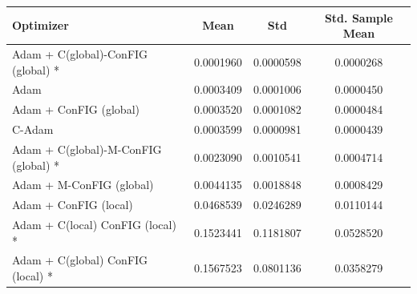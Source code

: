 \begin{table}[H]
    \centering
    \label{tab:optimizer_results}
    \begin{tabular}{lccc}
        \toprule
        \textbf{Optimizer} & \textbf{Mean} & \textbf{Std} & \textbf{Std. Sample Mean} \\
        \midrule
        Adam + C(global)-ConFIG (global) * & 0.0001960 & 0.0000598 & 0.0000268 \\
        Adam & 0.0003409 & 0.0001006 & 0.0000450 \\
        Adam + ConFIG (global) & 0.0003520 & 0.0001082 & 0.0000484 \\
        C-Adam & 0.0003599 & 0.0000981 & 0.0000439 \\
        Adam + C(global)-M-ConFIG (global) * & 0.0023090 & 0.0010541 & 0.0004714 \\
        Adam + M-ConFIG (global) & 0.0044135 & 0.0018848 & 0.0008429 \\
        Adam + ConFIG (local) & 0.0468539 & 0.0246289 & 0.0110144 \\
        Adam + C(local) ConFIG (local) * & 0.1523441 & 0.1181807 & 0.0528520 \\
        Adam + C(global) ConFIG (local) * & 0.1567523 & 0.0801136 & 0.0358279 \\
        \bottomrule
    \end{tabular}
\end{table}
